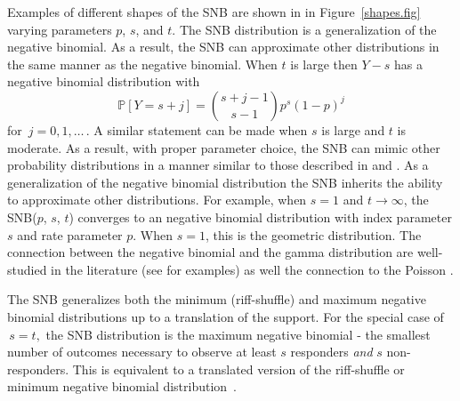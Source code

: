 \documentclass[sii]{ipart}
\begin{document}
Examples of different 
shapes of the SNB are shown in in Figure~\ref{shapes.fig} varying parameters $p$, 
$s$, and $t$. The SNB distribution is a generalization of the negative 
binomial. As a result, the SNB can approximate other distributions in the same
manner as the negative binomial. When $t$ is large then $Y-s$ has a 
negative binomial distribution with
\begin{equation*}                                    %
\mathbb{P}[Y=s+j ]        \label{nb1.eq}          
  = {{s+j-1}\choose{s-1}} p^s (1-p)^j
\end{equation*}
for $\,j=0, 1,\ldots\,$. A similar statement can be made when $s$ is large
and $t$ is moderate. As a result, with proper parameter choice, the SNB
can mimic other probability distributions in a manner similar to 
those described in \cite{Best1974} and \cite{Peizer1968}. As a generalization of the negative binomial distribution the 
SNB inherits the ability to approximate other distributions. For example,
when $s=1$ and $t \rightarrow \infty$, the SNB($p$, $s$, $t$) converges
to an negative binomial distribution with index parameter $s$ and rate parameter $p$. When $s=1$, this is the geometric distribution. The connection between the negative binomial and the gamma distribution
are well-studied in the literature (see \cite{Best1974,Ord1968,Guenther1972} for examples) as well the connection to the Poisson \cite{Anscombe1950}.


The SNB generalizes both the minimum (riff-shuffle) and maximum negative
binomial distributions up to a translation of the support.
For the special case of $\,s=t,$ the SNB distribution is the
maximum negative binomial \cite{Johnson2005,Zelterman2005,Zhang2000} - 
the smallest number of outcomes necessary to 
observe at least $s$ responders {\em and} $s$ non-responders. This is equivalent to a 
translated version of the riff-shuffle or minimum negative binomial 
distribution~\citep{Johnson2005,Uppuluri1967}.
\end{document}
